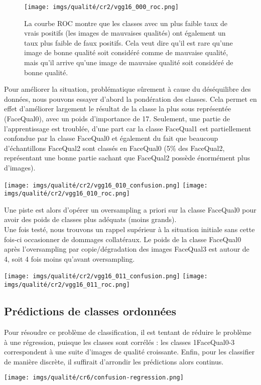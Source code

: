 \begin{figure}
    \centering
    \texttt{[image: imgs/qualité/cr2/vgg16\_000\_roc.png]}
    \caption[Courbe ROC associé pour une 1re classification]{La \gls{courbe ROC} montre que les classes avec un plus faible taux de vrais positifs (les images de mauvaises qualités) ont également un taux plus faible de faux positifs. Cela veut dire qu'il est rare qu'une image de bonne qualité soit considéré comme de mauvaise qualité, mais qu'il arrive qu'une image de mauvaise qualité soit considéré de bonne qualité.}
    \label{fig:my_label}
\end{figure}

Pour améliorer la situation, problématique sûrement à cause du déséquilibre des données, nous pouvons essayer d'abord la pondération des classes. Cela permet en effet d'améliorer largement le résultat de la classe la plus sous représentée (FaceQual0), avec un poids d'importance de 17. Seulement, une partie de l'apprentissage est troublée, d'une part car la classe FaceQual1 est partiellement confondue par la classe FaceQual0 et également du fait que beaucoup d'échantillons FaceQual2 sont classés en FaceQual0 (5\% des FaceQual2, représentant une bonne partie sachant que FaceQual2 possède énormément plus d'images).


\begin{center}
    \texttt{[image: imgs/qualité/cr2/vgg16\_010\_confusion.png]}
    \texttt{[image: imgs/qualité/cr2/vgg16\_010\_roc.png]}
\end{center}

Une piste est alors d'opérer un \gls{oversampling} a priori sur la classe FaceQual0 pour avoir des poids de classes plus adéquats (moins grands). \\

Une fois testé, nous trouvons un \gls{rappel} supérieur à la situation initiale sans cette fois-ci occasionner de dommages collatéraux. Le poids de la classe FaceQual0 après l'\gls{oversampling} par copie/dégradation des images FaceQual3 est autour de 4, soit 4 fois moins qu'avant \gls{oversampling}.

\begin{center}
    \texttt{[image: imgs/qualité/cr2/vgg16\_011\_confusion.png]}
    \texttt{[image: imgs/qualité/cr2/vgg16\_011\_roc.png]}
\end{center}

\subsection{Prédictions de classes ordonnées}
Pour résoudre ce problème de \gls{classification}, il est tentant de réduire le problème à une régression, puisque les classes sont corrélés : les classes 1FaceQual0-3 correspondent à une suite d'images de qualité croissante.
Enfin, pour les classifier de manière discrète, il suffirait d'arrondir les prédictions alors continus.
\begin{center}
    \texttt{[image: imgs/qualité/cr6/confusion-regression.png]}
\end{center}


